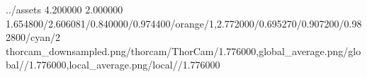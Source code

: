 \TrioComparisonFigure
    {../assets}
    {4.200000}
    {2.000000}
    {1.654800/2.606081/0.840000/0.974400/orange/1,2.772000/0.695270/0.907200/0.982800/cyan/2}
    {thorcam_downsampled.png/thorcam/ThorCam/1.776000,global_average.png/global//1.776000,local_average.png/local//1.776000}
